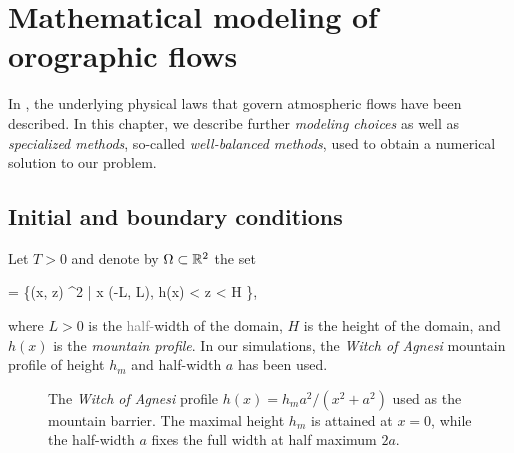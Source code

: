 \documentclass[../main.tex]{subfiles}
\begin{document}
\chapter{Mathematical modeling of orographic flows}
\label{chap:MODELLING}

In , the underlying physical laws that govern atmospheric flows have been described. In this chapter, we describe further \emph{modeling choices} as well as \emph{specialized methods}, so-called \emph{well-balanced methods}, used to obtain a numerical solution to our problem.

\section{Initial and boundary conditions}
\label{sec:IBCs}

Let $T>0$ and denote by $\Omega \subset \mathbb{R}^2$ the set

\begin{equations}[single,!,numberline=all]
\label{eq:OMEGA}
\Omega = \left\{\left(x, z\right) \in \R^2 \middle| x \in \left(-L, L\right), h(x) < z < H \right\},
\end{equations}

where $L > 0$ is the \textcolor{gray}{half-}width of the domain, $H$ is the height of the domain, and $h(x)$ is the \emph{mountain profile}. In our simulations, the \emph{Witch of Agnesi} mountain profile  of height $h_m$ and half-width $a$ has been used.

\begin{figure}[htbp]
	\centering
	\caption[The Witch of Agnesi mountain profile]{%
		The \emph{Witch of Agnesi} profile $h(x) = h_m a^2/(x^2 + a^2)$ used as the mountain barrier. The maximal height $h_m$ is attained at $x = 0$, while the half-width $a$ fixes the full width at half maximum $2a$. 
	}
	\label{fig:WITCH-OF-AGNESI}
\end{figure}
\end{document}
